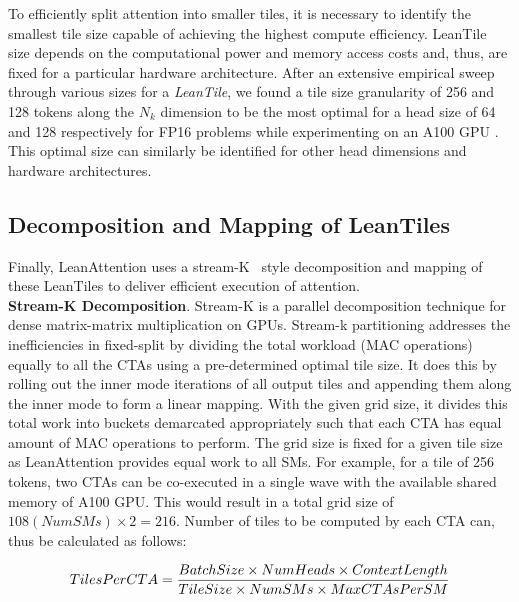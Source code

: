 To efficiently split attention into smaller tiles, it is necessary to identify the smallest tile size capable of achieving the highest compute efficiency. LeanTile size depends on the computational power and memory access costs and, thus, are fixed for a particular hardware architecture. After an extensive empirical sweep through various sizes for a \textit{LeanTile}, we found a tile size granularity of 256 and 128 tokens along the $N_k$ dimension to be the most optimal for a head size of 64 and 128 respectively for FP16 problems while experimenting on an A100 GPU \cite{nvidiaA100, jia2021dissecting}. This optimal size can similarly be identified for other head dimensions and hardware architectures.

\subsection{Decomposition and Mapping of LeanTiles}
\label{subsec:streamkmapping}
Finally, LeanAttention uses a stream-K~\cite{streamk} style decomposition and mapping of these LeanTiles to deliver efficient execution of attention. \\

{\textbf{Stream-K Decomposition}}. Stream-K is a parallel decomposition technique for dense matrix-matrix multiplication on GPUs. Stream-k partitioning addresses the inefficiencies in fixed-split by dividing the total workload (MAC operations) equally to all the CTAs using a pre-determined optimal tile size. It does this by rolling out the inner mode iterations of all output tiles and appending them along the inner mode to form a linear mapping. With the given grid size, it divides this total work into buckets demarcated appropriately such that each CTA has equal amount of MAC operations to perform. The grid size is fixed for a given tile size as LeanAttention provides equal work to all SMs. For example, for a tile of 256 tokens, two CTAs can be co-executed in a single wave with the available shared memory of A100 GPU. This would result in a total grid size of $108 (NumSMs) \times 2 = 216$. Number of tiles to be computed by each CTA can, thus be calculated as follows:

\begin{equation}
\footnotesize
TilesPerCTA = \frac{BatchSize \times NumHeads \times ContextLength}{TileSize \times NumSMs \times MaxCTAsPerSM}
\end{equation}

